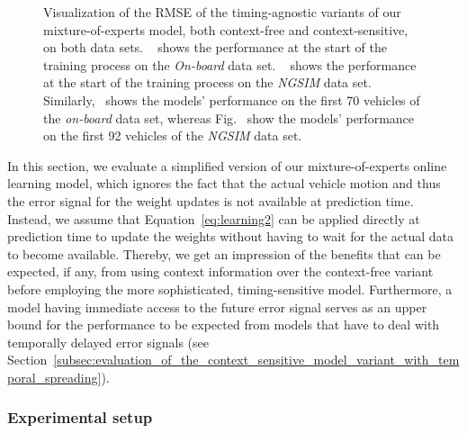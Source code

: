 \begin{figure}[t]
{    }
    \caption{Visualization of the \ac{RMSE} of the timing-agnostic variants of our mixture-of-experts model, both context-free and context-sensitive, on both data sets.
~\protect{} shows the performance at the start of the training process on the \emph{On-board} data set. 
~\protect{} shows the performance at the start of the training process on the \emph{\ac{NGSIM}} data set. Similarly,~\protect{} shows the models' performance on the first \num{70} vehicles of the \emph{on-board} data set, whereas Fig.~\protect{} show the models' performance on the first \num{92} vehicles of the \emph{\ac{NGSIM}} data set.}
    \label{fig:mix_timing_agnostic}
\end{figure}

In this section, we evaluate a simplified version of our mixture-of-experts online learning model, which ignores the fact that the actual vehicle motion and thus the error signal for the weight updates is not available at prediction time.
Instead, we assume that Equation~\eqref{eq:learning2} can be applied directly at prediction time to update the weights without having to wait for the actual data to become available.
Thereby, we get an impression of the benefits that can be expected, if any, from using context information over the context-free variant before employing the more sophisticated, timing-sensitive model.
Furthermore, a model having immediate access to the future error signal serves as an upper bound for the performance to be expected from models that have to deal with temporally delayed error signals (see Section~\ref{subsec:evaluation_of_the_context_sensitive_model_variant_with_temporal_spreading}). 

\subsubsection{Experimental setup}%
\label{ssubsec:experimental_setup}


